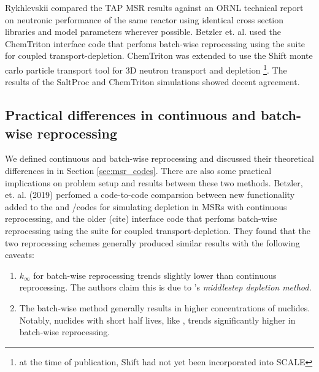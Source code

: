 Rykhlevskii compared the TAP MSR results against an \Gls{ORNL} technical report on neutronic performance of the same reactor\cite{betzler_assessment_2017} using identical cross section libraries and model parameters wherever possible. Betzler et. al. used the ChemTriton\cite{betzler_molten_2017} interface code that perfoms batch-wise reprocessing using
the \SCALE suite for coupled transport-depletion. ChemTriton was extended to use the Shift\cite{davidson_nuclide_2017} monte carlo particle transport tool for 3D neutron transport and depletion \footnote{at the time of publication, Shift had not yet been incorporated into SCALE}. The results of the SaltProc and ChemTriton simulations showed decent agreement.


\subsection{Practical differences in continuous and batch-wise reprocessing}
We defined continuous and batch-wise reprocessing and discussed their
theoretical differences in in Section \ref{sec:msr_codes}. There are also some
practical implications on problem setup and results between these two methods.
Betzler, et. al. (2019) \cite{betzler_molten_2019} perfomed a code-to-code
comparsion between new functionality added to the \ORIGEN and \SCALE/\TRITON codes
for simulating depletion in \Gls{MSR}s with continuous reprocessing, and the
older \ChemTriton(cite) interface code that perfoms batch-wise reprocessing using
the \SCALE suite for coupled transport-depletion. They found that the two
reprocessing schemes generally produced similar results with the following
caveats:
\begin{enumerate}
    \item $k_{\infty}$ for batch-wise reprocessing trends slightly lower than  continuous reprocessing. The authors claim this is due to \ChemTriton's \it{middlestep depletion method}. 
    \item The batch-wise method generally results in higher concentrations of nuclides. Notably, nuclides with short half lives, like , trends significantly higher in batch-wise reprocessing.
\end{enumerate}


